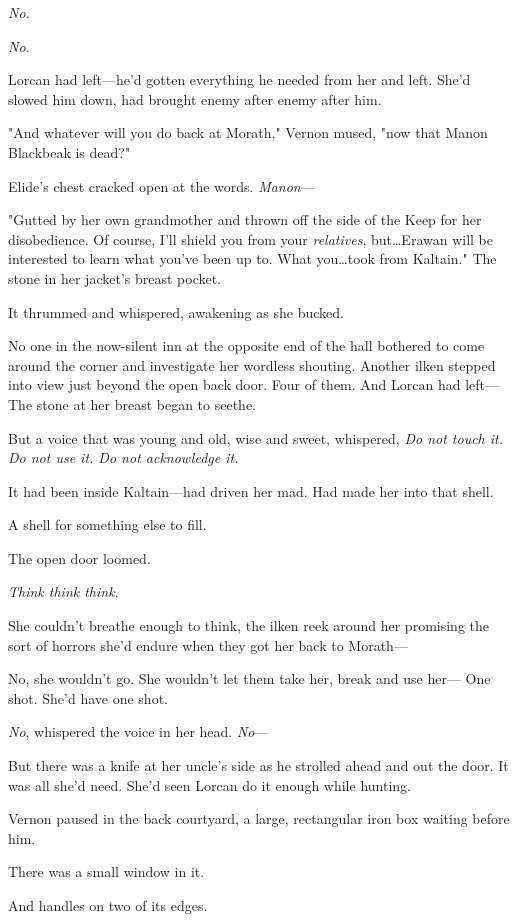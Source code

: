 \emph{No.}

\emph{No.}

Lorcan had left---he'd gotten everything he needed from her and left.
She'd slowed him down, had brought enemy after enemy after him.

"And whatever will you do back at Morath," Vernon mused, "now that Manon Blackbeak is dead?"

Elide's chest cracked open at the words.
\emph{Manon}---

"Gutted by her own grandmother and thrown off the side of the Keep for her disobedience.
Of course, I'll shield you from your \emph{relatives}, but\ldots Erawan will be interested to learn what you've been up to.
What you\ldots took from Kaltain."
The stone in her jacket's breast pocket.

It thrummed and whispered, awakening as she bucked.

No one in the now-silent inn at the opposite end of the hall bothered to come around the corner and investigate her wordless shouting.
Another ilken stepped into view just beyond the open back door.
Four of them.
And Lorcan had left--- The stone at her breast began to seethe.

But a voice that was young and old, wise and sweet, whispered, \emph{Do not touch it.
Do not use it.
Do not acknowledge it.}

It had been inside Kaltain---had driven her mad.
Had made her into that  shell.

A shell for something else to fill.

The open door loomed.

\emph{Think think think}.

She couldn't breathe enough to think, the ilken reek around her promising the sort of horrors she'd endure when they got her back to Morath---

No, she wouldn't go.
She wouldn't let them take her, break and use her--- One shot.
She'd have one shot.

\emph{No}, whispered the voice in her head.
\emph{No}---

But there was a knife at her uncle's side as he strolled ahead and out the door.
It was all she'd need.
She'd seen Lorcan do it enough while hunting.

Vernon paused in the back courtyard, a large, rectangular iron box waiting before him.

There was a small window in it.

And handles on two of its edges.


